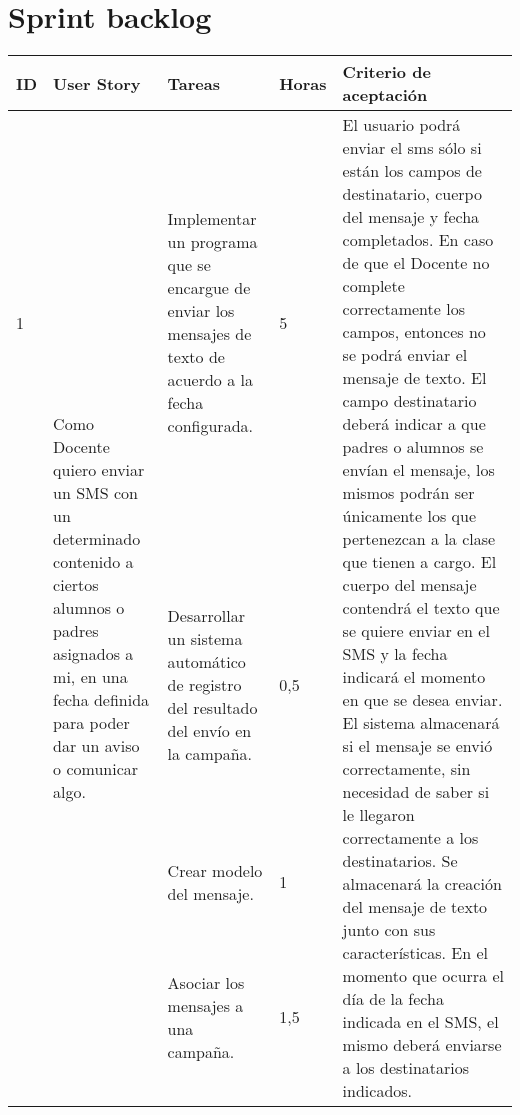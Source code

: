 \documentclass[a4paper, 11pt]{article}
\begin{document}
\section{Sprint backlog}
\begin{table}[H]
\centering
\begin{tabular}{ | p{0.5cm} | p{4cm} | p{5cm} | p{0.85cm} | p{5cm} | }
\hline
ID & User Story & Tareas & Horas & Criterio de aceptación \\
\hline \hline

1 & \multirow{4}{4cm}{Como Docente quiero enviar un SMS con un determinado contenido a ciertos alumnos o padres asignados a mi, en una fecha definida para poder dar un aviso o comunicar algo.} & Implementar un programa que se encargue de enviar los mensajes de texto de acuerdo a la fecha configurada. & 5 & \multirow{4}{5cm}{El usuario podrá enviar el sms sólo si están los  campos de destinatario, cuerpo del mensaje y fecha completados. En caso de que el Docente no complete correctamente los campos, entonces no se podrá enviar el mensaje de texto. El campo destinatario deberá indicar a que padres o alumnos se envían el mensaje, los mismos podrán ser únicamente los que pertenezcan a la clase que tienen a cargo. El cuerpo del mensaje contendrá el texto que se quiere enviar en el SMS y la fecha indicará el momento en que se desea enviar. El sistema almacenará si el mensaje se envió correctamente, sin necesidad de saber si le llegaron correctamente a los destinatarios.
Se almacenará la creación del mensaje de texto junto con sus características. 
En el momento que ocurra el día de la fecha indicada en el SMS, el mismo deberá enviarse a los destinatarios indicados. } \\[3.5cm] \cline{3-4} 
& & Desarrollar un sistema automático de registro del resultado del envío en la campaña. & 0,5 & \\[3.5cm] \cline{3-4} 
& & Crear modelo del mensaje. & 1 & \\[3.5cm] \cline{3-4} 
& & Asociar los mensajes a una campaña. & 1,5 & \\[3.5cm] \hline

\end{tabular}
\end{table}
\end{document}
